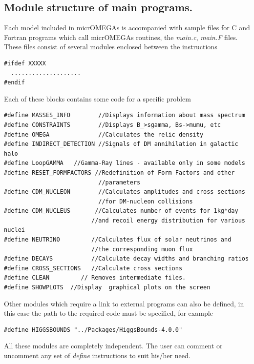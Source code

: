 \documentclass[12pt,a4paper]{article}
\begin{document}
\subsection{Module structure of main programs.}
Each model included in micrOMEGAs  is accompanied with sample files for
C and Fortran programs which call micrOMEGAs routines, the {\it main.c}, {\it main.F} files.  
These files   consist of
several modules enclosed between the instructions
\begin{verbatim}
#ifdef XXXXX
  ....................
#endif
\end{verbatim}
Each of these blocks  contains some code for a specific problem
{\small
\begin{verbatim}
#define MASSES_INFO        //Displays information about mass spectrum 
#define CONSTRAINTS        //Displays B_>sgamma, Bs->mumu, etc
#define OMEGA              //Calculates the relic density 
#define INDIRECT_DETECTION //Signals of DM annihilation in galactic halo
#define LoopGAMMA   //Gamma-Ray lines - available only in some models
#define RESET_FORMFACTORS //Redefinition of Form Factors and other
                           //parameters 
#define CDM_NUCLEON        //Calculates amplitudes and cross-sections
                           //for DM-nucleon collisions 
#define CDM_NUCLEUS       //Calculates number of events for 1kg*day
                         //and recoil energy distribution for various nuclei
#define NEUTRINO         //Calculates flux of solar neutrinos and
                         //the corresponding muon flux 
#define DECAYS           //Calculate decay widths and branching ratios  
#define CROSS_SECTIONS   //Calculate cross sections 
#define CLEAN         // Removes intermediate files.
#define SHOWPLOTS  //Display  graphical plots on the screen
\end{verbatim}
}
Other modules which require a link to external programs can also be defined, in this case the path to the required code must be specified, for example 

{\small
\begin{verbatim}
#define HIGGSBOUNDS "../Packages/HiggsBounds-4.0.0"
\end{verbatim}
}

All these modules are completely independent. The user can comment or
uncomment any set of {\it define} instructions to suit his/her need. 
\end{document}
